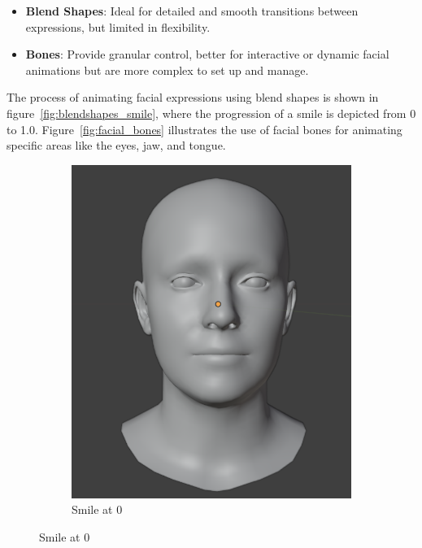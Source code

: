 \documentclass[../../main.tex]{subfiles}
\begin{document}
\begin{itemize}
  \item \textbf{Blend Shapes}: Ideal for detailed and smooth transitions between expressions, but limited in flexibility.
  \item \textbf{Bones}: Provide granular control, better for interactive or dynamic facial animations but are more complex to set up and manage.
\end{itemize}

The process of animating facial expressions using blend shapes is shown in figure~\ref{fig:blendshapes_smile}, where the progression of a smile is depicted from 0 to 1.0. Figure~\ref{fig:facial_bones} illustrates the use of facial bones for animating specific areas like the eyes, jaw, and tongue.

\begin{figure}[h]
  \centering
  \begin{subfigure}{0.3\linewidth} 
      \includegraphics[width=\linewidth]{chapters/background_work/images/blendshapes_example/blendshapes_example_1.png} 
      \caption{Smile at 0} 
  \end{subfigure} 

\end{figure}
\end{document}
